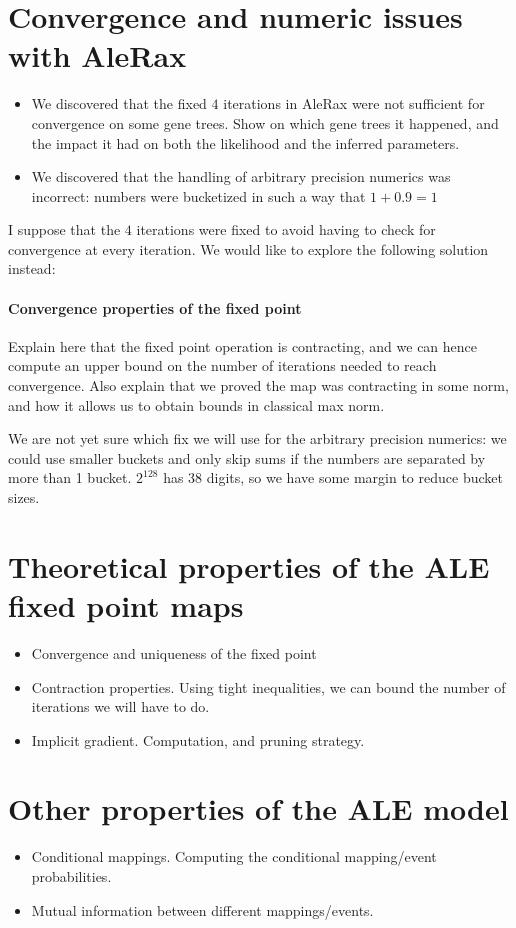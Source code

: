 \documentclass{article}
\newcommand{\1}{\mathbf{1}}
\begin{document}
\section{Convergence and numeric issues with AleRax}
\begin{itemize}
    \item We discovered that the fixed $4$ iterations in AleRax were not sufficient for convergence on some gene trees. Show on which gene trees it happened, and the impact it had on both the likelihood and the inferred parameters.
    \item We discovered that the handling of arbitrary precision numerics was incorrect: numbers were bucketized in such a way that $1 + 0.9 = 1$
\end{itemize} 

I suppose that the $4$ iterations were fixed to avoid having to check for convergence at every iteration. We would like to explore the following solution instead:
\paragraph{Convergence properties of the fixed point}
Explain here that the fixed point operation is contracting, and we can hence compute an upper bound on the number of iterations needed to reach convergence. Also explain that we proved the map was contracting in some norm, and how it allows us to obtain bounds in classical max norm.

We are not yet sure which fix we will use for the arbitrary precision numerics: we could use smaller buckets and only skip sums if the numbers are separated by more than 1 bucket. $2^128$ has $38$ digits, so we have some margin to reduce bucket sizes.

\section{Theoretical properties of the ALE fixed point maps}
\begin{itemize}
    \item Convergence and uniqueness of the fixed point
    \item Contraction properties. Using tight inequalities, we can bound the number of iterations we will have to do.
    \item Implicit gradient. Computation, and pruning strategy.
\end{itemize}
\section{Other properties of the ALE model}
\begin{itemize}
    \item Conditional mappings. Computing the conditional mapping/event probabilities.
    \item Mutual information between different mappings/events.
\end{itemize}
\end{document}
